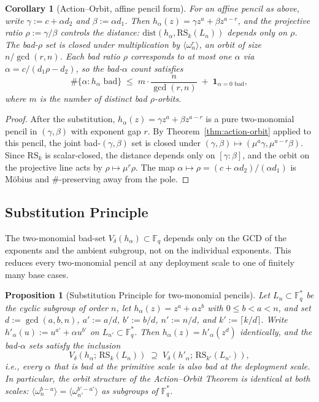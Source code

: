 \documentclass[11pt]{article}
\newtheorem{proposition}[theorem]{Proposition}
\newtheorem{corollary}[theorem]{Corollary}
\theoremstyle{definition}
\theoremstyle{remark}
\newcommand{\FF}{\mathbb{F}}
\newcommand{\RS}{\mathrm{RS}}
\newcommand{\dist}{\mathrm{dist}}
\begin{document}
\begin{corollary}[Action--Orbit, affine pencil form]
\label{cor:affine-orbit}
For an affine pencil as above, write $\gamma := c + \alpha d_2$ and
$\beta := \alpha d_1$. Then $h_\alpha(z) = \gamma z^a + \beta z^{a-r}$, and
the projective ratio $\rho := \gamma / \beta$ controls the distance:
$\dist(h_\alpha, \RS_k(L_n))$ depends only on $\rho$. The bad-$\rho$ set is
closed under multiplication by $\langle \omega_n^{r} \rangle$, an orbit of
size $n / \gcd(r, n)$. Each bad ratio $\rho$ corresponds to at most one
$\alpha$ via $\alpha = c / (d_1 \rho - d_2)$, so the bad-$\alpha$ count
satisfies
\[
\#\{\alpha : h_\alpha \text{ bad}\} \;\leq\; m \cdot \frac{n}{\gcd(r,n)} \;+\; \mathbf{1}_{\alpha=0\text{ bad}},
\]
where $m$ is the number of distinct bad $\rho$-orbits.
\end{corollary}

\begin{proof}
After the substitution, $h_\alpha(z) = \gamma z^a + \beta z^{a-r}$ is a pure
two-monomial pencil in $(\gamma, \beta)$ with exponent gap $r$. By
Theorem~\ref{thm:action-orbit} applied to this pencil, the joint bad-$(\gamma,
\beta)$ set is closed under $(\gamma, \beta) \mapsto (\mu^a \gamma, \mu^{a-r}
\beta)$. Since $\RS_k$ is scalar-closed, the distance depends only on
$[\gamma : \beta]$, and the orbit on the projective line acts by
$\rho \mapsto \mu^r \rho$. The map $\alpha \mapsto \rho = (c + \alpha d_2)/
(\alpha d_1)$ is M\"obius and $\#$-preserving away from the pole.
\end{proof}

\subsection{Substitution Principle}
\label{ssec:substitution-principle}

The two-monomial bad-set $V_\delta(h_\alpha) \subset \FF_q$ depends only
on the GCD of the exponents and the ambient subgroup, not on the
individual exponents. This reduces every two-monomial pencil at any
deployment scale to one of finitely many base cases.

\begin{proposition}[Substitution Principle for two-monomial pencils]
\label{prop:substitution}
Let $L_n \subset \FF_q^*$ be the cyclic subgroup of order $n$, let
$h_\alpha(z) = z^a + \alpha z^b$ with $0 \leq b < a < n$, and set
$d := \gcd(a, b, n)$, $a' := a/d$, $b' := b/d$, $n' := n/d$, and
$k' := \lceil k/d \rceil$. Write $h'_\alpha(u) := u^{a'} + \alpha u^{b'}$
on $L_{n'} \subset \FF_q^*$. Then $h_\alpha(z) = h'_\alpha(z^d)$
identically, and the bad-$\alpha$ sets satisfy the inclusion
\[
V_\delta(h_\alpha;\, \RS_k(L_n)) \;\supseteq\; V_\delta(h'_\alpha;\, \RS_{k'}(L_{n'})),
\]
i.e., every $\alpha$ that is bad at the primitive scale is also bad
at the deployment scale. In particular, the orbit structure of the
Action--Orbit Theorem is identical at both scales:
$\langle\omega_n^{b-a}\rangle = \langle\omega_{n'}^{b'-a'}\rangle$
as subgroups of $\FF_q^*$.
\end{proposition}
\end{document}
